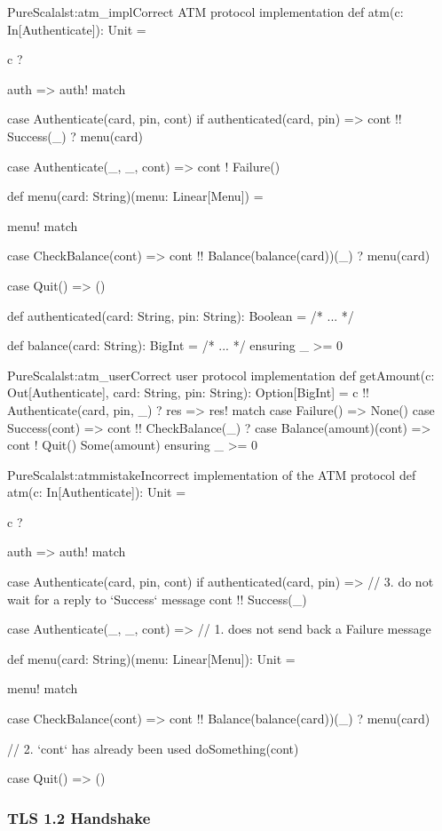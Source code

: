\documentclass[a4paper,twoside]{article}
\begin{document}
\begin{Code}{PureScala}{lst:atm_impl}{Correct ATM protocol implementation}
def atm(c: In[Authenticate]): Unit = {
  c ? { auth => auth! match {  
    case Authenticate(card, pin, cont) if authenticated(card, pin) =>
      cont !! Success(_) ? menu(card)
  
    case Authenticate(_, _, cont)  =>
      cont ! Failure()
  } }
}

def menu(card: String)(menu: Linear[Menu]) = {
  menu! match {
    case CheckBalance(cont) =>
      cont !! Balance(balance(card))(_) ? menu(card)

    case Quit() => ()
  }
}

def authenticated(card: String, pin: String): Boolean = {
  /* ... */
}

def balance(card: String): BigInt = {
  /* ... */
} ensuring { _ >= 0 }
\end{Code}

\begin{Code}{PureScala}{lst:atm_user}{Correct user protocol implementation}
def getAmount(c: Out[Authenticate], card: String, pin: String): Option[BigInt] = {
  c !! Authenticate(card, pin, _) ? { res =>
    res! match {
      case Failure() => None()
      case Success(cont) => cont !! CheckBalance(_) ? {
        case Balance(amount)(cont) =>
          cont ! Quit()
          Some(amount)
      }
    }
  }
} ensuring { _ >= 0 }
\end{Code}

\begin{Code}{PureScala}{lst:atmmistake}{Incorrect implementation of the ATM protocol}
def atm(c: In[Authenticate]): Unit = {
  c ? { auth => auth! match {  
    case Authenticate(card, pin, cont) if authenticated(card, pin) =>
      // 3. do not wait for a reply to `Success` message
      cont !! Success(_)
  
    case Authenticate(_, _, cont) =>
      // 1. does not send back a Failure message

  } }
}

def menu(card: String)(menu: Linear[Menu]): Unit = {
  menu! match {
    case CheckBalance(cont) =>
      cont !! Balance(balance(card))(_) ? menu(card)
      
      // 2. `cont` has already been used
      doSomething(cont)

    case Quit() => ()
  }
}
\end{Code}

\subsubsection{TLS 1.2 Handshake}
\end{document}
